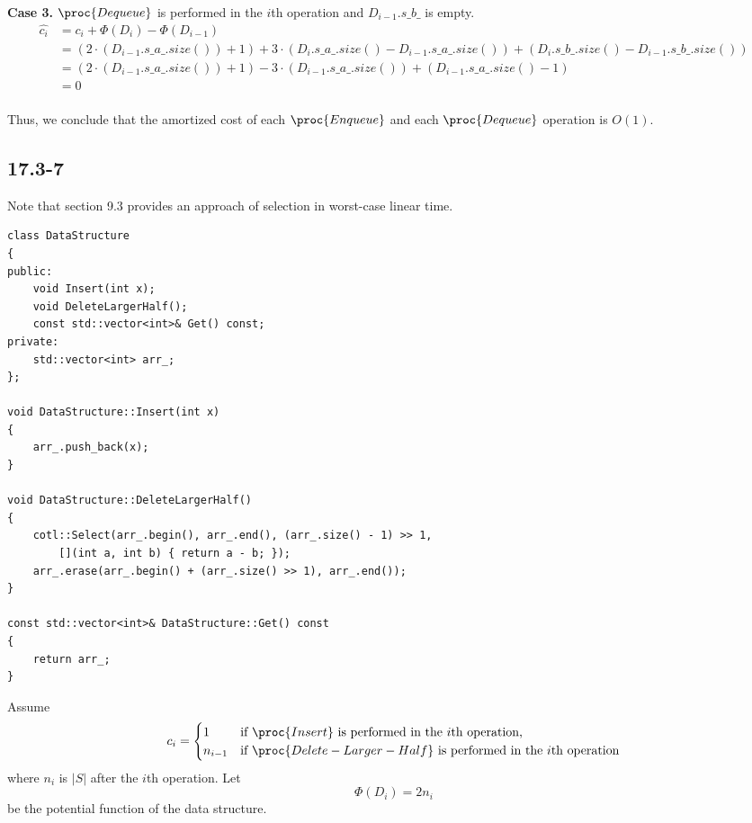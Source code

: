 \textbf{Case 3.} 
$\proc{Dequeue}$ is performed in the $i$th operation
and $D_{i-1}.s\_b\_$ is empty.
\begin{equation*}
\begin{split}
    \hat{c_i} & = c_i + \Phi(D_i) - \Phi(D_{i-1}) \\
    & = (2 \cdot (D_{i-1}.s\_a\_.size()) + 1)
         + 3 \cdot (D_i.s\_a\_.size() - D_{i-1}.s\_a\_.size()) 
        + (D_i.s\_b\_.size() - D_{i-1}.s\_b\_.size())\\
    & = (2 \cdot (D_{i-1}.s\_a\_.size()) + 1) 
        - 3 \cdot (D_{i-1}.s\_a\_.size()) + (D_{i-1}.s\_a\_.size() - 1) \\
    & = 0 \\
\end{split}
\end{equation*}

Thus, we conclude that the amortized cost of each
$\proc{Enqueue}$ and each $\proc{Dequeue}$ operation
is $O(1)$.

\subsection*{17.3-7}

Note that section 9.3 provides an approach of selection in worst-case linear time.

\begin{verbatim}
class DataStructure
{
public:
    void Insert(int x);
    void DeleteLargerHalf();
    const std::vector<int>& Get() const;
private:
    std::vector<int> arr_;
};

void DataStructure::Insert(int x)
{
    arr_.push_back(x);
}

void DataStructure::DeleteLargerHalf()
{
    cotl::Select(arr_.begin(), arr_.end(), (arr_.size() - 1) >> 1, 
        [](int a, int b) { return a - b; });
    arr_.erase(arr_.begin() + (arr_.size() >> 1), arr_.end());
}

const std::vector<int>& DataStructure::Get() const
{
    return arr_;
}
\end{verbatim}

Assume
\begin{equation*}
    c_i = 
    \begin{cases}
        1 & \text{if $\proc{Insert}$ is performed in the $i$th operation,} \\
        n_{i-1} & \text{if $\proc{Delete-Larger-Half}$ 
            is performed in the $i$th operation} \\
    \end{cases}
\end{equation*}
where $n_i$ is $|S|$ after the $i$th operation.
Let
\begin{equation*}
    \Phi(D_i) = 2n_i
\end{equation*}
be the potential function of the data structure.

